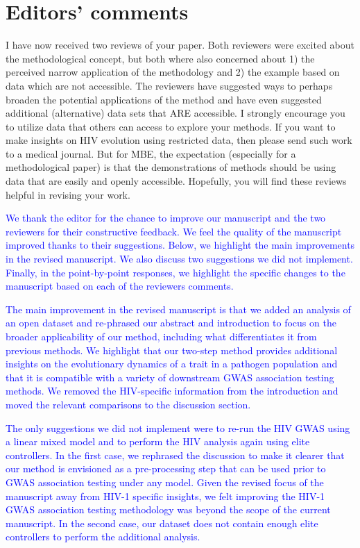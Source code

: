 \documentclass[11pt]{article}
\begin{document}
\stopsection
\newpage
\section*{Editors’ comments}
I have now received two reviews of your paper. Both reviewers were excited about the methodological concept, but both where also concerned about 1) the perceived narrow application of the methodology and 2) the example based on data which are not accessible. The reviewers have suggested ways to perhaps broaden the potential applications of the method and have even suggested additional (alternative) data sets that ARE accessible.  I strongly encourage you to utilize data that others can access to explore your methods. If you want to make insights on HIV evolution using restricted data, then please send such work to a medical journal. But for MBE, the expectation (especially for a methodological paper) is that the demonstrations of methods should be using data that are easily and openly accessible.  Hopefully, you will find these reviews helpful in revising your work.

\textcolor{blue}{We thank the editor for the chance to improve our manuscript and the two reviewers for their constructive feedback. We feel the quality of the manuscript improved thanks to their suggestions. Below, we highlight the main improvements in the revised manuscript. We also discuss two suggestions we did not implement. Finally, in the point-by-point responses, we highlight the specific changes to the manuscript based on each of the reviewers comments.}

\textcolor{blue}{The main improvement in the revised manuscript is that we added an analysis of an open dataset and re-phrased our abstract and introduction to focus on the broader applicability of our method, including what differentiates it from previous methods. We highlight that our two-step method provides additional insights on the evolutionary dynamics of a trait in a pathogen population and that it is compatible with a variety of downstream GWAS association testing methods. We removed the HIV-specific information from the introduction and moved the relevant comparisons to the discussion section.}

\textcolor{blue}{The only suggestions we did not implement were to re-run the HIV GWAS using a linear mixed model and to perform the HIV analysis again using elite controllers. In the first case, we rephrased the discussion to make it clearer that our method is envisioned as a pre-processing step that can be used prior to GWAS association testing under any model. Given the revised focus of the manuscript away from HIV-1 specific insights, we felt improving the HIV-1 GWAS association testing methodology was beyond the scope of the current manuscript. In the second case, our dataset does not contain enough elite controllers to perform the additional analysis.}
\end{document}
